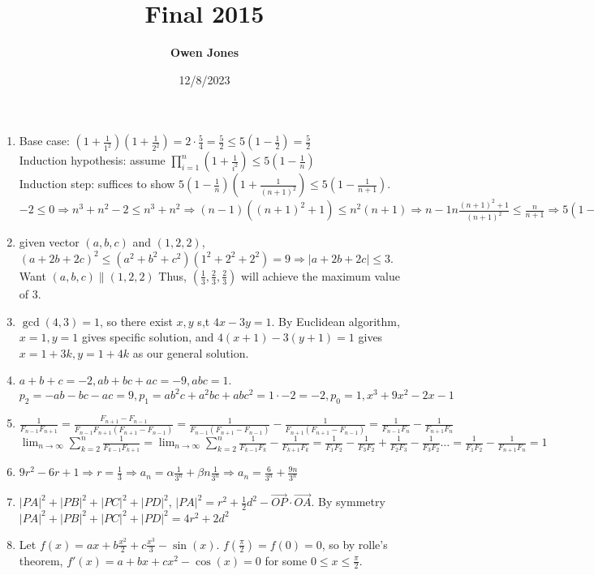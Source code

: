 \documentclass[10pt]{article}
\title{\bf Final 2015}
\date{12/8/2023}
\author{\bf Owen Jones}
\begin{document}
\maketitle
\begin{enumerate}[label= (Q-\arabic*)]
    \item Base case: $(1+\frac{1}{1^2})(1+\frac{1}{2^2})=2\cdot\frac{5}{4}=\frac{5}{2}\le 5(1-\frac{1}{2})=\frac{5}{2}$\\
    Induction hypothesis: assume $\prod_{i=1}^{n}(1+\frac{1}{i^2})\le 5(1-\frac{1}{n})$\\
    Induction step: suffices to show $5(1-\frac{1}{n})(1+\frac{1}{{(n+1)}^2})\le 5(1-\frac{1}{n+1})$.\\
    $-2\le0\Rightarrow n^3+n^2-2\le n^3+n^2\Rightarrow (n-1)({(n+1)}^2+1)\le n^2(n+1)\Rightarrow {n-1}{n}\frac{{(n+1)}^2+1}{{(n+1)}^2}\le\frac{n}{n+1}\Rightarrow 5(1-\frac{1}{n})(1+\frac{1}{{(n+1)}^2})\le 5(1-\frac{1}{n+1})$
    \item given vector $(a,b,c)$ and $(1,2,2)$, $(a+2b+2c)^2\le (a^2+b^2+c^2)(1^2+2^2+2^2)=9\Rightarrow |a+2b+2c|\le 3$. Want $(a,b,c)\parallel (1,2,2)$ Thus, $(\frac{1}{3},\frac{2}{3},\frac{2}{3})$ will achieve the maximum value of $3$.
    \item $\gcd(4,3)=1$, so there exist $x,y$ s,t $4x-3y=1$. By Euclidean algorithm, $x=1,y=1$ gives specific solution, and $4(x+1)-3(y+1)=1$ gives $x=1+3k,y=1+4k$ as our general solution.
    \item $a+b+c=-2,ab+bc+ac=-9,abc=1$. $p_2=-ab-bc-ac=9,p_1=ab^2c+a^2bc+abc^2=1\cdot-2=-2,p_0=1,x^3+9x^2-2x-1$
    \item $\frac{1}{F_{n-1}F_{n+1}}=\frac{F_{n+1}-F_{n-1}}{F_{n-1}F_{n+1}(F_{n+1}-F_{n-1})}=\frac{1}{F_{n-1}(F_{n+1}-F_{n-1})}-\frac{1}{F_{n+1}(F_{n+1}-F_{n-1})}=\frac{1}{F_{n-1}F_n}-\frac{1}{F_{n+1}F_n}$\\
    $\lim_{n\rightarrow\infty}\sum_{k=2}^{n}\frac{1}{F_{k-1}F_{k+1}}=\lim_{n\rightarrow\infty}\sum_{k=2}^{n}\frac{1}{F_{k-1}F_k}-\frac{1}{F_{k+1}F_k}=\frac{1}{F_{1}F_2}-\frac{1}{F_{3}F_2}+\frac{1}{F_{2}F_3}-\frac{1}{F_{3}F_2}\ldots=\frac{1}{F_{1}F_2}-\frac{1}{F_{n+1}F_n}=1$
    \item $9r^2-6r+1\Rightarrow r=\frac{1}{3}\Rightarrow a_n=\alpha \frac{1}{3^n}+\beta n\frac{1}{3^n}\Rightarrow a_n=\frac{6}{3^n}+\frac{9n}{3^n}$
    \item ${|PA|}^2+{|PB|}^2+{|PC|}^2+{|PD|}^2$, ${|PA|}^2=r^2+\frac{1}{2}d^2-\vec{OP}\cdot\vec{OA}$. By symmetry ${|PA|}^2+{|PB|}^2+{|PC|}^2+{|PD|}^2=4r^2+2d^2$
    \item Let $f(x)=ax+b\frac{x^2}{2}+c\frac{x^3}{3}-\sin(x)$. $f(\frac{\pi}{2})=f(0)=0$, so by rolle's theorem, $f'(x)=a+bx+cx^2-\cos(x)=0$ for some $0\le x\le \frac{\pi}{2}$.

\end{enumerate}
\end{document}
